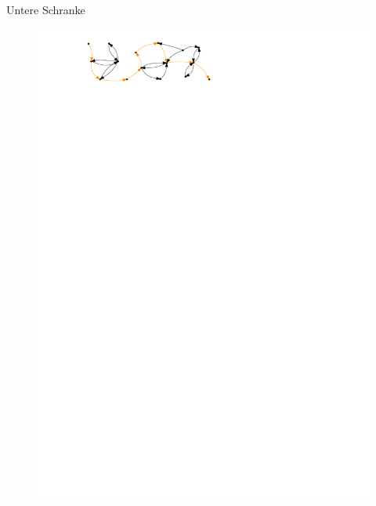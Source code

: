 \documentclass[18pt]{beamer}
\begin{document}
\begin{frame}{Untere Schranke}
{\begin{figure}
	\includegraphics[page=3]{pdf/longestpath.pdf}
	\end{figure}
	}
\end{frame}
\end{document}
